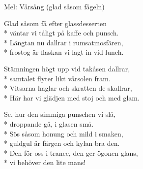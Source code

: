 \begin{SongText}
    \begin{SongInfo}
        Mel: Vårsång (glad såsom fågeln)
    \end{SongInfo}
    \begin{SongVerse}
        Glad såsom få efter glassdesserten\\*%
        väntar vi tåligt på kaffe och punsch.\\*%
        Längtan nu dallrar i rumsatmosfären,\\*%
        frostog är flaskan vi lagt in vid lunch.
    \end{SongVerse}
    \begin{SongVerse}
        Stämningen högt upp vid takåsen dallrar,\\*%
        samtalet flyter likt vårsolen fram.\\*%
        Vitsarna haglar och skratten de skallrar,\\*%
        Här har vi glädjen med stoj och med glam.
    \end{SongVerse}
    \begin{SongVerse}
        Se, hur den simmiga punschen vi slå,\\*%
        droppande gå, i glasen små.\\*%
        Sös såsom honung och mild i smaken,\\*%
        guldgul är färgen och kylan bra den.\\*%
        Den för oss i trance, den ger ögonen glans,\\*%
        vi behöver den lite mans!
    \end{SongVerse}\end{SongText}
